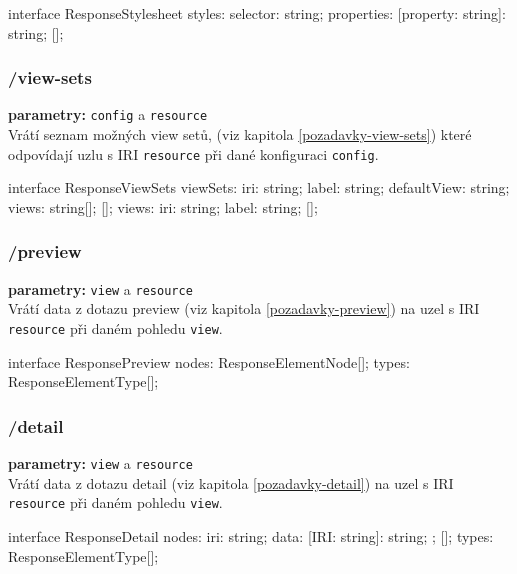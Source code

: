 \begin{code}
interface ResponseStylesheet {
    styles: {
        selector: string;
        properties: {
            [property: string]: string;
        }
    }[];
}
\end{code}

\subsubsection{/view-sets}
\textbf{parametry:} \texttt{config} a \texttt{resource} \\
Vrátí seznam možných view setů, (viz kapitola \ref{pozadavky-view-sets}) které odpovídají uzlu s IRI \texttt{resource} při dané konfiguraci \texttt{config}.

\begin{code}
interface ResponseViewSets {
    viewSets: {
        iri: string;
        label: string;
        defaultView: string;
        views: string[];
    }[];
    views: {
        iri: string;
        label: string;
    }[];
}
\end{code}

\subsubsection{/preview}
\textbf{parametry:} \texttt{view} a \texttt{resource} \\
Vrátí data z dotazu preview (viz kapitola \ref{pozadavky-preview}) na uzel s IRI \texttt{resource} při daném pohledu \texttt{view}.

\begin{code}
interface ResponsePreview {
    nodes: ResponseElementNode[];
    types: ResponseElementType[];
}
\end{code}

\subsubsection{/detail}
\textbf{parametry:} \texttt{view} a \texttt{resource} \\
Vrátí data z dotazu detail (viz kapitola \ref{pozadavky-detail}) na uzel s IRI \texttt{resource} při daném pohledu \texttt{view}.

\begin{code}
interface ResponseDetail {
    nodes: {
        iri: string;
        data: {
            [IRI: string]: string;
        };
    }[];
    types: ResponseElementType[];
}
\end{code}

